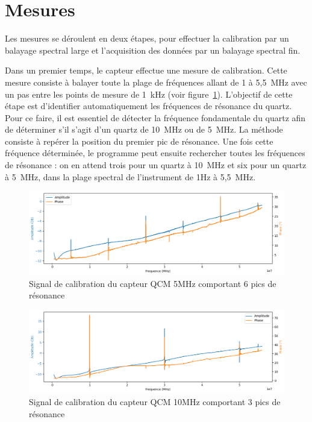 
\newpage

\section{Mesures}

Les mesures se déroulent en deux étapes, pour effectuer la calibration par un balayage spectral large et l'acquisition des données par un balayage spectral fin.

Dans un premier temps, le capteur effectue une mesure de calibration. Cette mesure consiste à balayer toute la plage de fréquences allant de 1 à 5{,}5~MHz avec un pas entre les points de mesure de 1~kHz (voir figure~\ref{fig:calibration 5MHz plot}).  
L’objectif de cette étape est d’identifier automatiquement les fréquences de résonance du quartz. Pour ce faire, il est essentiel de détecter la fréquence fondamentale du quartz afin de déterminer s’il s’agit d’un quartz de 10~MHz ou de 5~MHz.  
La méthode consiste à repérer la position du premier pic de résonance. Une fois cette fréquence déterminée, le programme peut ensuite rechercher toutes les fréquences de résonance : on en attend trois pour un quartz à 10~MHz et six pour un quartz à 5~MHz, dans la plage spectral de l'instrument de 1Hz à 5{,}5~MHz.

\begin{figure}[H]
    \centering
    \includegraphics[width=\textwidth]{assets/figures/5MhzCalibration.png}
    \caption{Signal de calibration du capteur QCM 5MHz comportant 6 pics de résonance}
    \label{fig:calibration 5MHz plot}
\end{figure}

\begin{figure}[H]
    \centering
    \includegraphics[width=\textwidth]{assets/figures/10MHzCalibration.png}
    \caption{Signal de calibration du capteur QCM 10MHz comportant 3 pics de résonance}
    \label{fig:harmonic 10MHz Calibration}
\end{figure}

